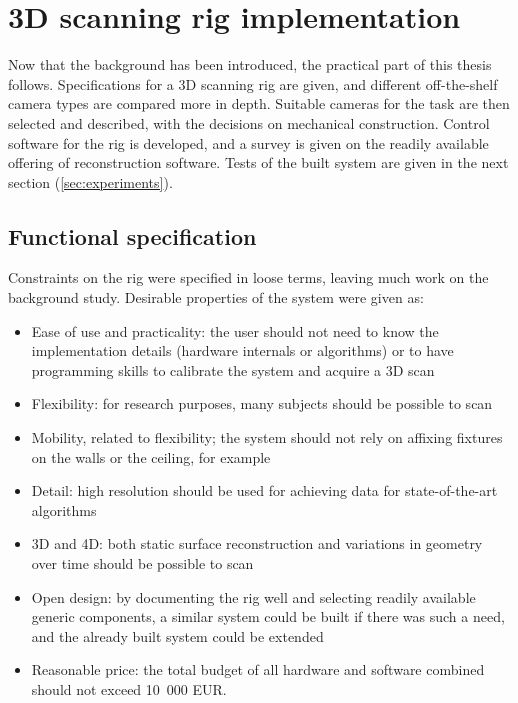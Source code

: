 \section{3D scanning rig implementation} \label{sec:implementation}

Now that the background has been introduced, the practical part of this thesis follows.
Specifications for a 3D scanning rig are given, and different off-the-shelf camera types are compared more in depth.
Suitable cameras for the task are then selected and described, with the decisions on mechanical construction.
Control software for the rig is developed, and a survey is given on the readily available offering of reconstruction software.
Tests of the built system are given in the next section (\ref{sec:experiments}).

\subsection{Functional specification} %

Constraints on the rig were specified in loose terms, leaving much work on the background study.
Desirable properties of the system were given as:

\begin{itemize}
	\item Ease of use and practicality: the user should not need to know the implementation details (hardware internals or algorithms) or to have programming skills to calibrate the system and acquire a 3D scan
	\item Flexibility: for research purposes, many subjects should be possible to scan
	\item Mobility, related to flexibility; the system should not rely on affixing fixtures on the walls or the ceiling, for example
	\item Detail: high resolution should be used for achieving data for state-of-the-art algorithms
	\item 3D and 4D: both static surface reconstruction and variations in geometry over time should be possible to scan
	\item Open design: by documenting the rig well and selecting readily available generic components, a similar system could be built if there was such a need, and the already built system could be extended
	\item Reasonable price: the total budget of all hardware and software combined should not exceed 10~000 EUR.
\end{itemize}

